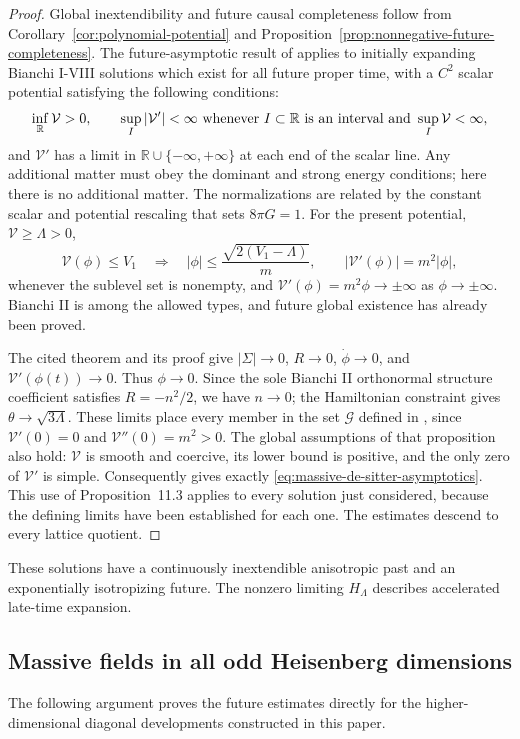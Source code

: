 \documentclass[10pt,a4paper]{article}
\numberwithin{equation}{section}
\theoremstyle{definition}
\theoremstyle{remark}
\newcommand{\R}{\mathbb R}
\begin{document}
\begin{proof}
Global inextendibility and future causal completeness follow from
Corollary~\ref{cor:polynomial-potential} and
Proposition~\ref{prop:nonnegative-future-completeness}.
The future-asymptotic result of
\cite[Theorem~1]{Rendall2004Scalar} applies to initially expanding
Bianchi I-VIII solutions which exist for all future proper time,
with a $C^2$ scalar potential satisfying the following conditions:
\[
 \inf_{\R}\mathcal V>0,\qquad
 \sup_I|\mathcal V'|<\infty
   \ \hbox{whenever $I\subset\R$ is an interval and}
          \ \sup_I\mathcal V<\infty,
\]
and $\mathcal V'$ has a limit in $\R\cup\{-\infty,+\infty\}$
at each end of the scalar line.  Any additional matter must obey the
dominant and strong energy conditions; here there is no additional
matter.  The normalizations are related by the constant scalar and
potential rescaling that sets $8\pi G=1$.
For the present potential, $\mathcal V\ge\Lambda>0$,
\[
 \mathcal V(\phi)\le V_1
 \quad\Longrightarrow\quad
 |\phi|\le\frac{\sqrt{2(V_1-\Lambda)}}m,
 \qquad |\mathcal V'(\phi)|=m^2|\phi|,
\]
whenever the sublevel set is nonempty, and
$\mathcal V'(\phi)=m^2\phi\to\pm\infty$ as
$\phi\to\pm\infty$.  Bianchi II is among the allowed types,
and future global existence has already been proved.

The cited theorem and its proof give
$|\Sigma|\to0$, $R\to0$, $\dot\phi\to0$, and
$\mathcal V'(\phi(t))\to0$.  Thus $\phi\to0$.
Since the sole Bianchi II orthonormal structure coefficient satisfies
$R=-n^2/2$, we have $n\to0$; the Hamiltonian constraint gives
$\theta\to\sqrt{3\Lambda}$.  These limits place every member in
the set $\mathcal G$ defined in
\cite[Proposition~11.1]{Ringstrom2025}, since
$\mathcal V'(0)=0$ and $\mathcal V''(0)=m^2>0$.
The global assumptions of that proposition also hold:
$\mathcal V$ is smooth and coercive, its lower bound is positive,
and the only zero of $\mathcal V'$ is simple.
Consequently \cite[Proposition~11.3]{Ringstrom2025} gives exactly
\eqref{eq:massive-de-sitter-asymptotics}.
This use of Proposition~11.3 applies to every solution just considered,
because the defining limits have been established for each one.
The estimates descend to every lattice quotient.
\end{proof}

These solutions have a continuously inextendible anisotropic past and
an exponentially isotropizing future.  The nonzero limiting
$H_\Lambda$ describes accelerated late-time expansion.

\subsection{Massive fields in all odd Heisenberg dimensions}
The following argument proves the future estimates directly for the
higher-dimensional diagonal developments constructed in this paper.
\end{document}
